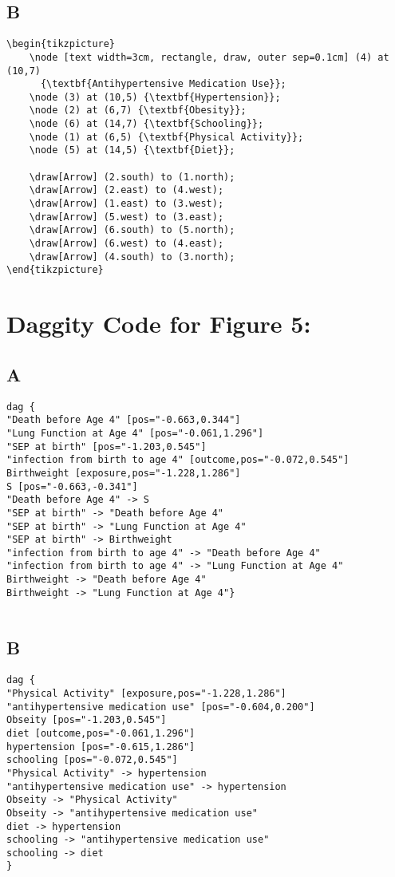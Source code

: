 \documentclass{article}
\begin{document}
\subsection*{B}
\begin{lstlisting}[frame=single, basicstyle=\ttfamily, linewidth=22.5cm]
\begin{tikzpicture}
    \node [text width=3cm, rectangle, draw, outer sep=0.1cm] (4) at (10,7)
      {\textbf{Antihypertensive Medication Use}};
    \node (3) at (10,5) {\textbf{Hypertension}};
    \node (2) at (6,7) {\textbf{Obesity}};
    \node (6) at (14,7) {\textbf{Schooling}};
    \node (1) at (6,5) {\textbf{Physical Activity}};
    \node (5) at (14,5) {\textbf{Diet}};

    \draw[Arrow] (2.south) to (1.north);
    \draw[Arrow] (2.east) to (4.west);
    \draw[Arrow] (1.east) to (3.west);
    \draw[Arrow] (5.west) to (3.east);
    \draw[Arrow] (6.south) to (5.north);
    \draw[Arrow] (6.west) to (4.east);
    \draw[Arrow] (4.south) to (3.north);
\end{tikzpicture}
\end{lstlisting}


\section*{Daggity Code for Figure 5:}
\subsection*{A}
\begin{lstlisting}[frame=single, basicstyle=\ttfamily]
dag {
"Death before Age 4" [pos="-0.663,0.344"]
"Lung Function at Age 4" [pos="-0.061,1.296"]
"SEP at birth" [pos="-1.203,0.545"]
"infection from birth to age 4" [outcome,pos="-0.072,0.545"]
Birthweight [exposure,pos="-1.228,1.286"]
S [pos="-0.663,-0.341"]
"Death before Age 4" -> S
"SEP at birth" -> "Death before Age 4"
"SEP at birth" -> "Lung Function at Age 4"
"SEP at birth" -> Birthweight
"infection from birth to age 4" -> "Death before Age 4"
"infection from birth to age 4" -> "Lung Function at Age 4"
Birthweight -> "Death before Age 4"
Birthweight -> "Lung Function at Age 4"}
        
\end{lstlisting}
\subsection*{B}
\begin{lstlisting}[frame=single, basicstyle=\ttfamily]
dag {
"Physical Activity" [exposure,pos="-1.228,1.286"]
"antihypertensive medication use" [pos="-0.604,0.200"]
Obseity [pos="-1.203,0.545"]
diet [outcome,pos="-0.061,1.296"]
hypertension [pos="-0.615,1.286"]
schooling [pos="-0.072,0.545"]
"Physical Activity" -> hypertension
"antihypertensive medication use" -> hypertension
Obseity -> "Physical Activity"
Obseity -> "antihypertensive medication use"
diet -> hypertension
schooling -> "antihypertensive medication use"
schooling -> diet
}
\end{lstlisting}
\end{document}
